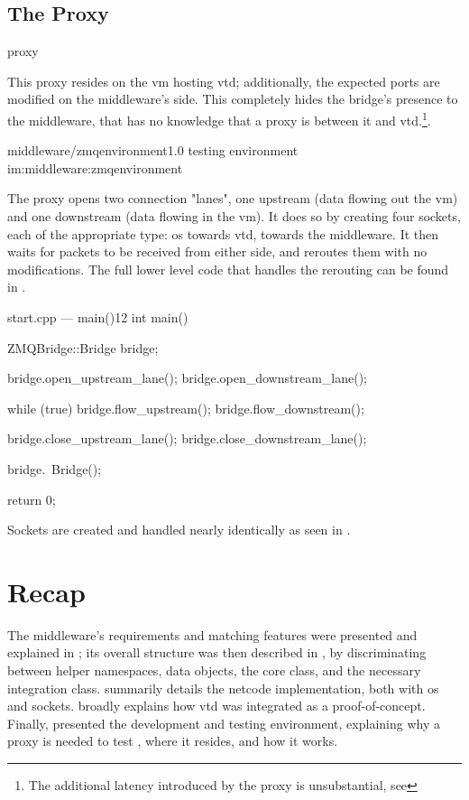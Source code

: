\subsection{The Proxy}

\begin{definition}{proxy}
\end{definition}

This \gls{proxy} resides on the \gls{vm} hosting \gls{vtd}; additionally, the expected ports are modified on the \gls{middleware}'s side. This completely hides the bridge's presence to the \gls{middleware}, that has no knowledge that a \gls{proxy} is between it and \gls{vtd}.\footnote{The additional latency introduced by the \gls{proxy} is unsubstantial, see }.

\begin{image}
	{middleware/zmqenvironment}{1.0}
	{ testing environment}
	{im:middleware:zmqenvironment}
	{}
	{}
\end{image}

The \gls{proxy} opens two connection "lanes", one upstream (data flowing out the \gls{vm}) and one downstream (data flowing in the \gls{vm}). It does so by creating four sockets, each of the appropriate type: \gls{os} towards \gls{vtd},  towards the \gls{middleware}. It then waits for \glspl{packet} to be received from either side, and reroutes them with no modifications. The full lower level code that handles the rerouting can be found in .

\begin{codelist}{start.cpp --- main()}{12}
int main() {
	ZMQBridge::Bridge bridge;

	bridge.open_upstream_lane();
	bridge.open_downstream_lane();

	while (true) {
		bridge.flow_upstream();
		bridge.flow_downstream();
	}

	bridge.close_upstream_lane();
	bridge.close_downstream_lane();

	bridge.~Bridge();

	return 0;
}
\end{codelist}

Sockets are created and handled nearly identically as seen in .

\section{Recap}\label{sc:middleware:recap}

The \gls{middleware}'s requirements and matching features were presented and explained in ; its overall structure was then described in , by discriminating between helper namespaces, data objects, the core class, and the necessary integration class.  summarily details the \gls{netcode} implementation, both with \gls{os} and  sockets.  broadly explains how \gls{vtd} was integrated as a proof-of-concept. Finally,  presented the development and testing environment, explaining why a \gls{proxy} is needed to test , where it resides, and how it works.
